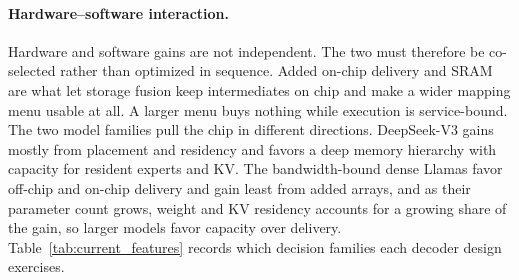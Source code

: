 \paragraph{Hardware--software interaction.}
Hardware and software gains are not independent.
The two must therefore be co-selected rather than optimized in sequence.
Added on-chip delivery and SRAM are what let storage fusion keep intermediates on chip and make a wider mapping menu usable at all.
A larger menu buys nothing while execution is service-bound.
The two model families pull the chip in different directions.
DeepSeek-V3 gains mostly from placement and residency and favors a deep memory hierarchy with capacity for resident experts and KV.
The bandwidth-bound dense Llamas favor off-chip and on-chip delivery and gain least from added arrays, and as their parameter count grows, weight and KV residency accounts for a growing share of the gain, so larger models favor capacity over delivery.
Table~\ref{tab:current_features} records which decision families each decoder design exercises.
